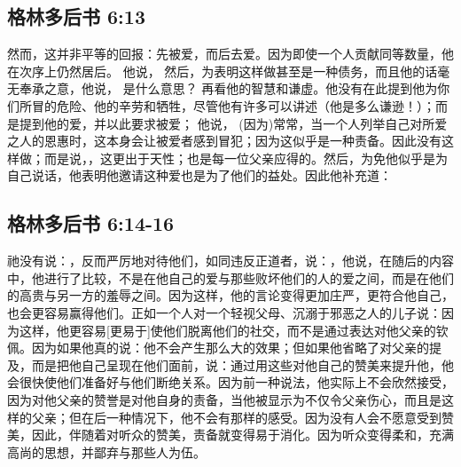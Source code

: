 
\subsection{格林多后书 6:13}

\par

然而，这并非平等的回报：先被爱，而后去爱。因为即使一个人贡献同等数量，他在次序上仍然居后。 他说， 然后，为表明这样做甚至是一种债务，而且他的话毫无奉承之意，他说，  是什么意思？ 再看他的智慧和谦虚。他没有在此提到他为你们所冒的危险、他的辛劳和牺牲，尽管他有许多可以讲述（他是多么谦逊！）；而是提到他的爱，并以此要求被爱； 他说， (因为)常常，当一个人列举自己对所爱之人的恩惠时，这本身会让被爱者感到冒犯；因为这似乎是一种责备。因此没有这样做；而是说，，这更出于天性；也是每一位父亲应得的。然后，为免他似乎是为自己说话，他表明他邀请这种爱也是为了他们的益处。因此他补充道：\par


\subsection{格林多后书 6:14-16}

\par

祂没有说：，反而严厉地对待他们，如同违反正道者，说：，他说，在随后的内容中，他进行了比较，不是在他自己的爱与那些败坏他们的人的爱之间，而是在他们的高贵与另一方的羞辱之间。因为这样，他的言论变得更加庄严，更符合他自己，也会更容易赢得他们。正如一个人对一个轻视父母、沉溺于邪恶之人的儿子说：因为这样，他更容易[更易于]使他们脱离他们的社交，而不是通过表达对他父亲的钦佩。因为如果他真的说：他不会产生那么大的效果；但如果他省略了对父亲的提及，而是把他自己呈现在他们面前，说：通过用这些对他自己的赞美来提升他，他会很快使他们准备好与他们断绝关系。因为前一种说法，他实际上不会欣然接受，因为对他父亲的赞誉是对他自身的责备，当他被显示为不仅令父亲伤心，而且是这样的父亲；但在后一种情况下，他不会有那样的感受。因为没有人会不愿意受到赞美，因此，伴随着对听众的赞美，责备就变得易于消化。因为听众变得柔和，充满高尚的思想，并鄙弃与那些人为伍。\par

